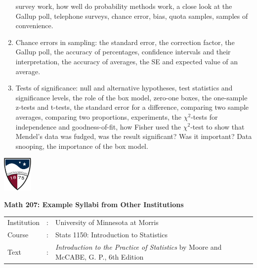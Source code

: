 \documentclass[10pt]{article}
\begin{document}
\begin{enumerate}
survey  work,  how  well  do  probability  methods  work,  a  close  look  at  the  Gallup  poll,  
telephone  surveys,  chance  error,  bias,  quota  samples,  samples  of  convenience.  
%  
\item Chance   errors   in   sampling:   the   standard   error,   the   correction   factor,   the   Gallup   poll,  
the   accuracy   of   percentages,   confidence   intervals   and   their   interpretation,   the  
accuracy  of  averages,  the  SE  and  expected  value  of  an  average.  
%
\item Tests   of   significance:   null   and   alternative   hypotheses,   test   statistics   and   significance  
levels,  the  role  of  the  box  model,  zero-one  boxes,  the  one-sample  z-tests  and  t-tests,  
the  standard  error  for  a  difference,  comparing  two  sample  averages,  comparing  two  
proportions,   experiments,   the   $\chi^2$-tests   for   independence   and   goodness-of-fit,   how  
Fisher   used   the   $\chi^2$-test   to   show   that   Mendel's   data   was   fudged,   was   the   result  
significant?  Was  it  important?    Data  snooping,  the  importance  of  the  box  model.  
\end{enumerate}

\vfill
\eject
\href{http://www.su.edu}{\includegraphics[height=1.75cm]{sulogo.eps}}
\vspace{-1.69cm}


\begin{center}
  \textbf{\large Math 207: Example Syllabi from Other Institutions}
\bigskip\bigskip
\end{center}


\begin{tabular}{lcl}
Institution & : &  University of Minnesota at Morris\\
Course      & : & Stats 1150:  Introduction to Statistics\\
Text        & : & \textit{Introduction to the Practice of Statistics} by Moore and McCABE, G. P., 6th Edition
\end{tabular}
\bigskip
\end{document}
